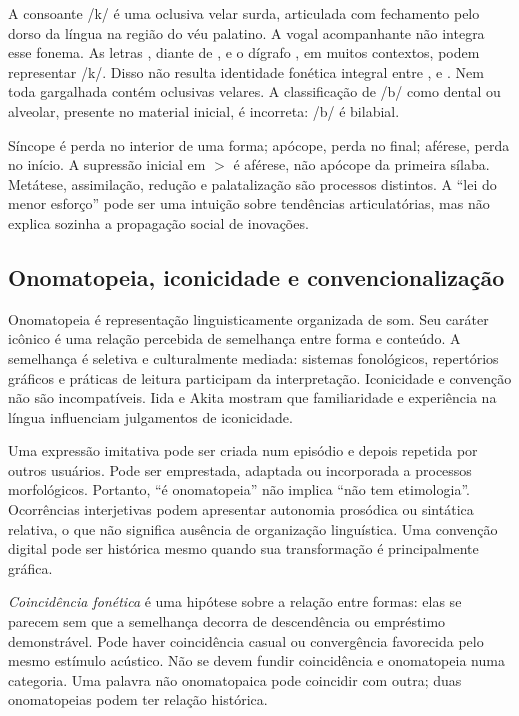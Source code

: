 A consoante /k/ é uma oclusiva velar surda, articulada com fechamento pelo dorso da língua na região do véu palatino. A vogal acompanhante não integra esse fonema. As letras , diante de , e o dígrafo , em muitos contextos, podem representar /k/. Disso não resulta identidade fonética integral entre ,  e . Nem toda gargalhada contém oclusivas velares. A classificação de /b/ como dental ou alveolar, presente no material inicial, é incorreta: /b/ é bilabial.

Síncope é perda no interior de uma forma; apócope, perda no final; aférese, perda no início. A supressão inicial em  $>$  é aférese, não apócope da primeira sílaba. Metátese, assimilação, redução e palatalização são processos distintos. A ``lei do menor esforço'' pode ser uma intuição sobre tendências articulatórias, mas não explica sozinha a propagação social de inovações.

\subsection{Onomatopeia, iconicidade e convencionalização}
Onomatopeia é representação linguisticamente organizada de som. Seu caráter icônico é uma relação percebida de semelhança entre forma e conteúdo. A semelhança é seletiva e culturalmente mediada: sistemas fonológicos, repertórios gráficos e práticas de leitura participam da interpretação. Iconicidade e convenção não são incompatíveis. Iida e Akita \cite{iida2024} mostram que familiaridade e experiência na língua influenciam julgamentos de iconicidade.

Uma expressão imitativa pode ser criada num episódio e depois repetida por outros usuários. Pode ser emprestada, adaptada ou incorporada a processos morfológicos. Portanto, ``é onomatopeia'' não implica ``não tem etimologia''. Ocorrências interjetivas podem apresentar autonomia prosódica ou sintática relativa, o que não significa ausência de organização linguística. Uma convenção digital pode ser histórica mesmo quando sua transformação é principalmente gráfica.

\emph{Coincidência fonética} é uma hipótese sobre a relação entre formas: elas se parecem sem que a semelhança decorra de descendência ou empréstimo demonstrável. Pode haver coincidência casual ou convergência favorecida pelo mesmo estímulo acústico. Não se devem fundir coincidência e onomatopeia numa categoria. Uma palavra não onomatopaica pode coincidir com outra; duas onomatopeias podem ter relação histórica.

